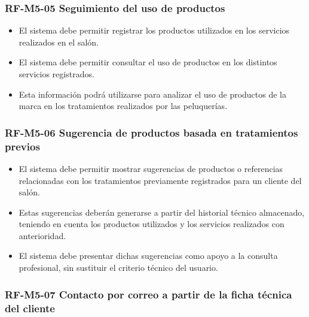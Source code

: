 \vspace{-0.75em}
\subsubsection{RF-M5-05 Seguimiento del uso de productos}
\vspace{-1em}

\begin{itemize}
    \item El sistema debe permitir registrar los productos utilizados en los servicios realizados en el salón.
    \item El sistema debe permitir consultar el uso de productos en los distintos servicios registrados.
    \item Esta información podrá utilizarse para analizar el uso de productos de la marca en los tratamientos realizados por las peluquerías.
\end{itemize}

\vspace{-0.75em}
\subsubsection{RF-M5-06 Sugerencia de productos basada en tratamientos previos}
\vspace{-1em}

\begin{itemize}
    \item El sistema debe permitir mostrar sugerencias de productos o referencias relacionadas con los tratamientos previamente registrados para un cliente del salón.
    \item Estas sugerencias deberán generarse a partir del historial técnico almacenado, teniendo en cuenta los productos utilizados y los servicios realizados con anterioridad.
    \item El sistema debe presentar dichas sugerencias como apoyo a la consulta profesional, sin sustituir el criterio técnico del usuario.
\end{itemize}

\vspace{-0.75em}
\subsubsection{RF-M5-07 Contacto por correo a partir de la ficha técnica del cliente}
\vspace{-1em}

